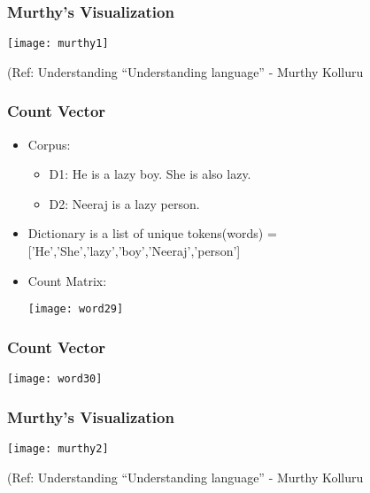 \begin{frame}[fragile]\frametitle{Murthy's Visualization}

\begin{center}
\texttt{[image: murthy1]}

{\tiny (Ref: Understanding ``Understanding language'' - Murthy Kolluru}

\end{center}

\end{frame}


\begin{frame}[fragile]\frametitle{Count Vector}
\begin{itemize}
\item Corpus:
\begin{itemize}
\item D1: He is a lazy boy. She is also lazy.
\item D2: Neeraj is a lazy person.
\end{itemize}
\item Dictionary is a list of unique tokens(words) =['He','She','lazy','boy','Neeraj','person'] 
\item Count Matrix:
\begin{center}
\texttt{[image: word29]}
\end{center}
\end{itemize}
\end{frame}

\begin{frame}[fragile]\frametitle{Count Vector}
\begin{center}
\texttt{[image: word30]}
\end{center}
\end{frame}


\begin{frame}[fragile]\frametitle{Murthy's Visualization}

\begin{center}
\texttt{[image: murthy2]}

{\tiny (Ref: Understanding ``Understanding language'' - Murthy Kolluru}

\end{center}

\end{frame}


